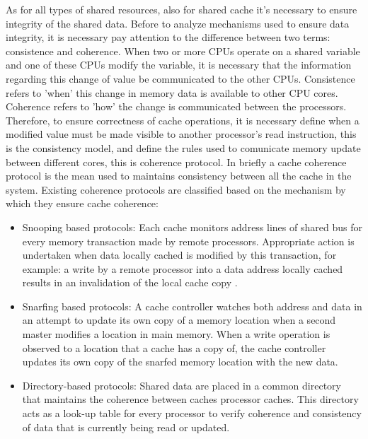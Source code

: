 As for all types of shared resources, also for shared cache it's necessary to ensure integrity of the shared data.
Before to analyze mechanisms used to ensure data integrity, it is necessary pay attention to the difference between two terms: consistence and coherence.
When two or more CPUs operate on a shared variable and one of these CPUs modify the variable, it is necessary that the information regarding
this change of value be communicated to the other CPUs. Consistence refers to 'when' this change in memory data is available to other CPU cores.
Coherence refers to 'how' the change is communicated between the processors. Therefore, to ensure correctness of cache operations, it is necessary define
when a modified value must be made visible to another processor's read instruction, this is the consistency model, and define the rules used to comunicate 
memory update between different cores, this is coherence protocol. In briefly a cache coherence protocol is the mean used to maintains consistency between
all the cache in the system. Existing coherence protocols are classified based on the mechanism by which they ensure cache coherence: 

\begin{itemize}

\item Snooping based protocols: Each cache monitors address lines of shared bus for every memory transaction made by remote processors. Appropriate action
is undertaken when data locally cached is modified by this transaction, for example: a write by a remote processor into a data address locally cached 
results in an invalidation of the local cache copy .

\item Snarfing based protocols: A cache controller watches both address and data in an attempt to update its own copy of a memory location when a second 
master modifies a location in main memory. When a write operation is observed to a location that a cache has a copy of, the cache controller updates its 
own copy of the snarfed memory location with the new data.

\item Directory-based protocols: Shared data are placed in a common directory that maintains the coherence between caches processor caches. 
This directory acts as a look-up table for every processor to verify coherence and consistency of data that is currently being read or updated.

\end{itemize}


